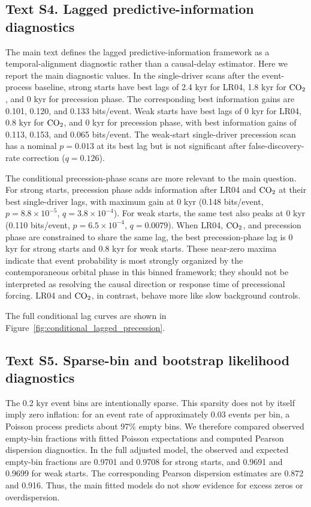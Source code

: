 \documentclass[11pt]{article}
\begin{document}
\subsection*{Text S4. Lagged predictive-information diagnostics}

The main text defines the lagged predictive-information framework as a temporal-alignment diagnostic rather than a causal-delay estimator. Here we report the main diagnostic values. In the single-driver scans after the event-process baseline, strong starts have best lags of 2.4 kyr for LR04, 1.8 kyr for \(\ce{CO2}\), and 0 kyr for precession phase. The corresponding best information gains are 0.101, 0.120, and 0.133 bits/event. Weak starts have best lags of 0 kyr for LR04, 0.8 kyr for \(\ce{CO2}\), and 0 kyr for precession phase, with best information gains of 0.113, 0.153, and 0.065 bits/event. The weak-start single-driver precession scan has a nominal \(p=0.013\) at its best lag but is not significant after false-discovery-rate correction (\(q=0.126\)).

The conditional precession-phase scans are more relevant to the main question. For strong starts, precession phase adds information after LR04 and \(\ce{CO2}\) at their best single-driver lags, with maximum gain at 0 kyr (0.148 bits/event, \(p=8.8\times10^{-5}\), \(q=3.8\times10^{-4}\)). For weak starts, the same test also peaks at 0 kyr (0.110 bits/event, \(p=6.5\times10^{-4}\), \(q=0.0079\)). When LR04, \(\ce{CO2}\), and precession phase are constrained to share the same lag, the best precession-phase lag is 0 kyr for strong starts and 0.8 kyr for weak starts. These near-zero maxima indicate that event probability is most strongly organized by the contemporaneous orbital phase in this binned framework; they should not be interpreted as resolving the causal direction or response time of precessional forcing. LR04 and \(\ce{CO2}\), in contrast, behave more like slow background controls.

The full conditional lag curves are shown in Figure~\ref{fig:conditional_lagged_precession}.

\subsection*{Text S5. Sparse-bin and bootstrap likelihood diagnostics}

The 0.2 kyr event bins are intentionally sparse. This sparsity does not by itself imply zero inflation: for an event rate of approximately 0.03 events per bin, a Poisson process predicts about 97\% empty bins. We therefore compared observed empty-bin fractions with fitted Poisson expectations and computed Pearson dispersion diagnostics. In the full adjusted model, the observed and expected empty-bin fractions are 0.9701 and 0.9708 for strong starts, and 0.9691 and 0.9699 for weak starts. The corresponding Pearson dispersion estimates are 0.872 and 0.916. Thus, the main fitted models do not show evidence for excess zeros or overdispersion.
\end{document}
